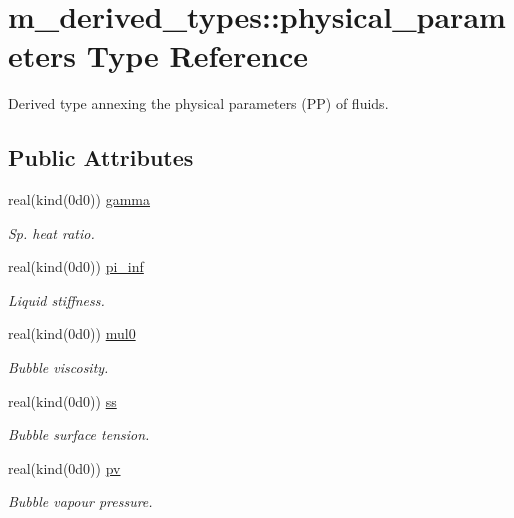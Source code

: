 \hypertarget{structm__derived__types_1_1physical__parameters}{}\section{m\+\_\+derived\+\_\+types\+:\+:physical\+\_\+parameters Type Reference}
\label{structm__derived__types_1_1physical__parameters}


Derived type annexing the physical parameters (PP) of fluids.  


\subsection*{Public Attributes}
\begin{DoxyCompactItemize}
\item 
real(kind(0d0)) \hyperlink{structm__derived__types_1_1physical__parameters_a767cbe0b3d10bf2fa0ab2e3372881413}{gamma}
\begin{DoxyCompactList}\small\item\em Sp. heat ratio. \end{DoxyCompactList}\item 
real(kind(0d0)) \hyperlink{structm__derived__types_1_1physical__parameters_a6dbc4e81d0c3ffd4fa80dcfc7a0ea31f}{pi\+\_\+inf}
\begin{DoxyCompactList}\small\item\em Liquid stiffness. \end{DoxyCompactList}\item 
real(kind(0d0)) \hyperlink{structm__derived__types_1_1physical__parameters_ac33958817dd32ef7a5536d2d1c81875f}{mul0}
\begin{DoxyCompactList}\small\item\em Bubble viscosity. \end{DoxyCompactList}\item 
real(kind(0d0)) \hyperlink{structm__derived__types_1_1physical__parameters_aabd7a1fe772c4e9a6e2f108266ebd94e}{ss}
\begin{DoxyCompactList}\small\item\em Bubble surface tension. \end{DoxyCompactList}\item 
real(kind(0d0)) \hyperlink{structm__derived__types_1_1physical__parameters_a7294e13410be9cba57955b3ab7d996a8}{pv}
\begin{DoxyCompactList}\small\item\em Bubble vapour pressure. \end{DoxyCompactList}\item 

\end{DoxyCompactItemize}
